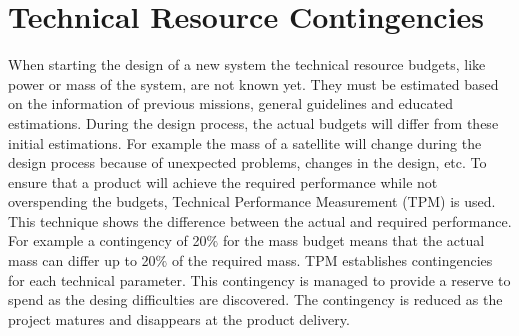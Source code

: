 \section{Technical Resource Contingencies}
\label{blCont}

When starting the design of a new system the technical resource budgets, like power or mass of the system, are not known yet. They must be estimated based on the information of previous missions, general guidelines and educated estimations. During the design process, the actual budgets will differ from these initial estimations. For example the mass of a satellite will change during the design process because of unexpected problems, changes in the design, etc. To ensure that a product will achieve the required performance while not overspending the budgets, Technical Performance Measurement (TPM) is used. This technique shows the difference between the actual and required performance. For example a contingency of 20$\%$ for the mass budget means that the actual mass can differ up to 20$\%$ of the required mass. TPM establishes contingencies for each technical parameter. This contingency is managed to provide a reserve to spend as the desing difficulties are discovered. The contingency is reduced as the project matures and disappears at the product delivery.

